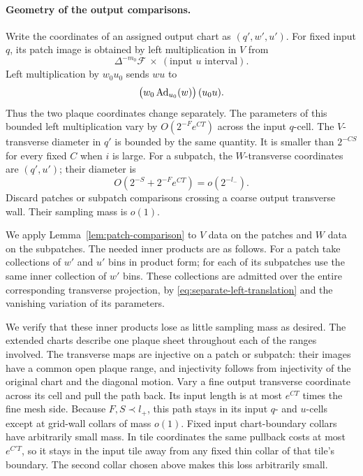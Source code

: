 \paragraph{Geometry of the output comparisons.}
Write the coordinates of an assigned output chart as
\((q',w',u')\).  For fixed input \(q\), its patch image is obtained
by left multiplication in \(V\) from
\[
                     \Delta^{-m_0}\mathcal F
                            \ \times\ (\text{input }u\text{ interval}).
\]
Left multiplication by \(w_0u_0\) sends \(wu\) to
\begin{equation}\label{eq:separate-left-translation}
                   \bigl(w_0\operatorname{Ad}_{u_0}(w)\bigr)\,(u_0u).
\end{equation}
Thus the two plaque coordinates change separately.  The
parameters of this bounded left multiplication vary by
\(O(2^{-F}e^{CT})\) across the input \(q\)-cell.
The \(V\)-transverse diameter in \(q'\) is bounded by the same
quantity.  It is smaller than \(2^{-CS}\) for every fixed \(C\)
when \(i\) is large.
For a subpatch, the \(W\)-transverse coordinates are
\((q',u')\); their diameter is
\[
                         O(2^{-S}+2^{-F}e^{CT})
                                  =o(2^{-l_-}).
\]
Discard patches or subpatch comparisons crossing a coarse
output transverse wall.  Their sampling mass is \(o(1)\).

We apply Lemma~\ref{lem:patch-comparison} to \(V\) data on the
patches and \(W\) data on the subpatches.  The needed inner
products are as follows.  For a patch take collections of
\(w'\) and \(u'\) bins in product form; for each of its subpatches
use the same inner collection of \(w'\) bins.  These collections
are admitted over the entire corresponding transverse
projection, by \eqref{eq:separate-left-translation} and the
vanishing variation of its parameters.

We verify that these inner products lose as little sampling
mass as desired.  The extended charts describe one plaque sheet
throughout each of the ranges involved.  The transverse maps
are injective on a patch or subpatch: their images have a common
open plaque range, and injectivity follows from injectivity of
the original chart and the diagonal motion.  Vary a fine output
transverse coordinate across its cell and pull the path back.
Its input length is at most \(e^{CT}\) times the fine mesh side.
Because \(F,S\prec l_+\), this path stays in its input \(q\)- and
\(u\)-cells except at grid-wall collars of mass \(o(1)\).
Fixed input chart-boundary collars have arbitrarily small mass.
In tile coordinates the same pullback costs at most \(e^{C'T}\),
so it stays in the input tile away from any fixed thin collar
of that tile's boundary.  The second collar chosen above makes
this loss arbitrarily small.

